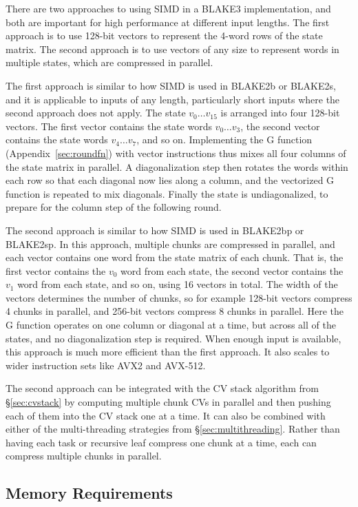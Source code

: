 \documentclass[11pt,notitlepage,a4paper]{article}
\begin{document}
There are two approaches to using SIMD in a BLAKE3 implementation, and both are
important for high performance at different input lengths. The first approach
is to use 128-bit vectors to represent the 4-word rows of the state matrix. The
second approach is to use vectors of any size to represent words in multiple
states, which are compressed in parallel.

The first approach is similar to how SIMD is used in BLAKE2b or BLAKE2s, and it
is applicable to inputs of any length, particularly short inputs where the
second approach does not apply. The state $v_0 \ldots v_{15}$ is arranged into
four 128-bit vectors. The first vector contains the state words $v_0 \ldots
v_3$, the second vector contains the state words $v_4 \ldots v_7$, and so on.
Implementing the G function (Appendix~\ref{sec:roundfn}) with vector
instructions thus mixes all four columns of the state matrix in parallel. A
diagonalization step then rotates the words within each row so that each
diagonal now lies along a column, and the vectorized G function is repeated to
mix diagonals. Finally the state is undiagonalized, to prepare for the column
step of the following round.

The second approach is similar to how SIMD is used in BLAKE2bp or BLAKE2sp. In
this approach, multiple chunks are compressed in parallel, and each vector
contains one word from the state matrix of each chunk. That is, the first
vector contains the $v_0$ word from each state, the second vector contains the
$v_1$ word from each state, and so on, using 16 vectors in total. The width of
the vectors determines the number of chunks, so for example 128-bit vectors
compress 4 chunks in parallel, and 256-bit vectors compress 8 chunks in
parallel. Here the G function operates on one column or diagonal at a time, but
across all of the states, and no diagonalization step is required. When enough
input is available, this approach is much more efficient than the first
approach. It also scales to wider instruction sets like AVX2 and AVX-512.

The second approach can be integrated with the CV stack algorithm from
\S\ref{sec:cvstack} by computing multiple chunk CVs in parallel and then
pushing each of them into the CV stack one at a time. It can also be combined
with either of the multi-threading strategies from \S\ref{sec:multithreading}.
Rather than having each task or recursive leaf compress one chunk at a time,
each can compress multiple chunks in parallel.

\subsection{Memory Requirements}\label{sec:memory}
\end{document}
